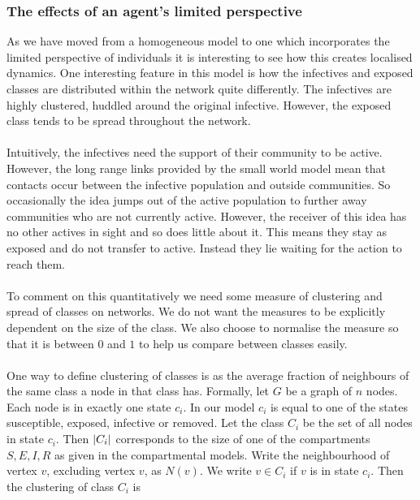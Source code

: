 \subsubsection{The effects of an agent's limited perspective}
As we have moved from a homogeneous model to one which incorporates the limited perspective of individuals it is interesting to see how this creates localised dynamics. One interesting feature in this model is how the infectives and exposed classes are distributed within the network quite differently. The infectives are highly clustered, huddled around the original infective. However, the exposed class tends to be spread throughout the network.\\
\\
Intuitively, the infectives need the support of their community to be active. However, the long range links provided by the small world model mean that contacts occur between the infective population and outside communities. So occasionally the idea jumps out of the active population to further away communities who are not currently active. However, the receiver of this idea has no other actives in sight and so does little about it. This means they stay as exposed and do not transfer to active.
\label{mmd}
Instead they lie waiting for the action to reach them.\\
\\
To comment on this quantitatively we need some measure of clustering and spread of classes on networks. We do not want the measures to be explicitly dependent on the size of the class. We also choose to normalise the measure so that it is between $0$ and $1$ to help us compare between classes easily.\\
\\
One way to define clustering of classes is as the average fraction of neighbours of the same class a node in that class has. Formally, let $G$ be a graph of $n$ nodes. Each node is in exactly one state $c_i$. In our model $c_i$ is equal to one of the states susceptible, exposed, infective or removed. Let the class $C_i$ be the set of all nodes in state $c_i$. Then $\lvert C_i\rvert$ corresponds to the size of one of the compartments $S,E,I,R$ as given in the compartmental models. Write the neighbourhood of vertex $v$, excluding vertex $v$, as $N(v)$. We write $v\in C_i$ if $v$ is in state $c_i$.
\label{mmd}
Then the clustering of class $C_i$ is
